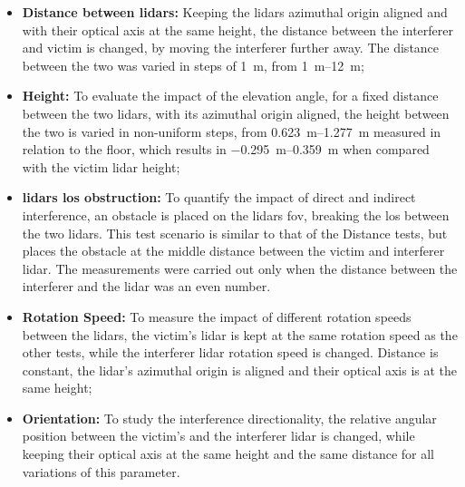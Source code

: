 \begin{itemize}
	\item \textbf{Distance between \acp{lidar}:} Keeping the \acp{lidar} azimuthal origin aligned and with their optical axis at the same height, the distance between the interferer and victim is changed, by moving the interferer further away. The distance between the two was varied in steps of \SI{1}{\meter}, from \SIrange{1}{12}{\meter};
\item \textbf{Height:} To evaluate the impact of the elevation angle, for a fixed distance between the two \acp{lidar}, with its azimuthal origin aligned, the height between the two is varied in non-uniform steps, from \SIrange{0.623}{1.277}{\meter} measured in relation to the floor, which results in \SIrange{-0.295}{0.359}{\meter} when compared with the victim \ac{lidar} height;
\item \textbf{\acp{lidar} \ac{los} obstruction:} To quantify the impact of direct and indirect interference, an obstacle is placed on the \acp{lidar} \ac{fov}, breaking the \ac{los} between the two \acp{lidar}. This test scenario is similar to that of the Distance tests, but places the obstacle at the middle distance between the victim and interferer \ac{lidar}. The measurements were carried out only when the distance between the interferer and the \ac{lidar} was an even number.
\item \textbf{Rotation Speed:} To measure the impact of different rotation speeds between the \acp{lidar}, the victim's \ac{lidar} is kept at the same rotation speed as the other tests, while the interferer \ac{lidar} rotation speed is changed. Distance is constant, the \ac{lidar}'s azimuthal origin is aligned and their optical axis is at the same height;
\item \textbf{Orientation:} To study the interference directionality, the relative angular position between the victim's and the interferer \ac{lidar} is changed, while keeping their optical axis at the same height and the same distance for all variations of this parameter.
\end{itemize}
 

